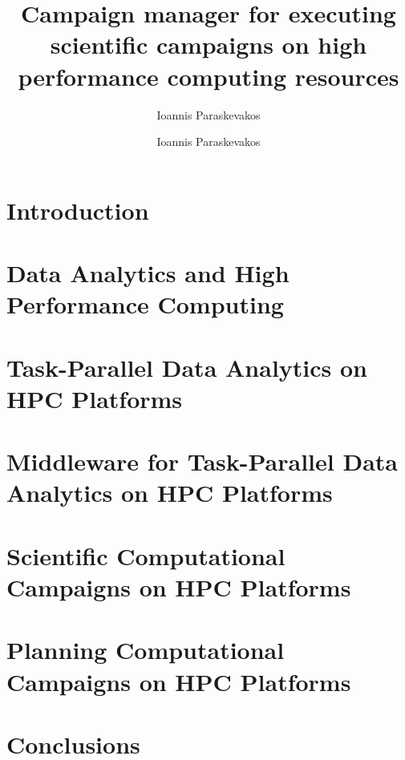 \documentclass[final]{ruthesis}
\begin{document}
\author{Ioannis Paraskevakos}
\copyrightp
\title{Campaign manager for executing scientific campaigns on high performance computing resources}
\author{Ioannis Paraskevakos}					
\figurespage
\tablespage

\abstract{}
\acknowledgements{}

\beforepreface
\afterpreface

\chapter{Introduction}


\chapter{Data Analytics and High Performance Computing}


\chapter{Task-Parallel Data Analytics on HPC Platforms}


\chapter{Middleware for Task-Parallel Data Analytics on HPC Platforms}


\chapter{Scientific Computational Campaigns on HPC Platforms}

\chapter{Planning Computational Campaigns on HPC Platforms}

\chapter{Conclusions}




\end{document}
